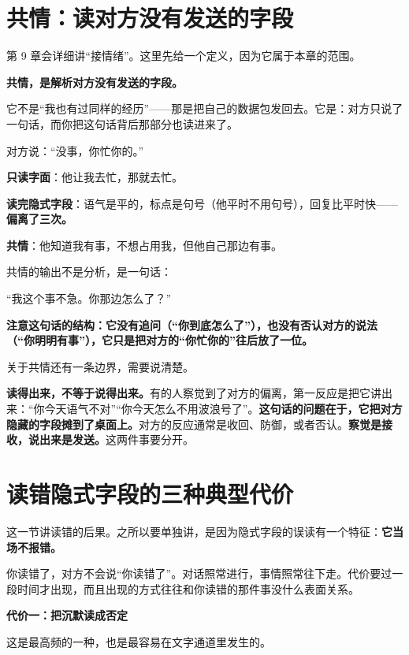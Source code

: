 \section{共情：读对方没有发送的字段}

第 9 章会详细讲“接情绪”。这里先给一个定义，因为它属于本章的范围。

\textbf{共情，是解析对方没有发送的字段。}

它不是“我也有过同样的经历”——那是把自己的数据包发回去。它是：对方只说了一句话，而你把这句话背后那部分也读进来了。

\begin{mdquote}
对方说：“没事，你忙你的。”

\textbf{只读字面}：他让我去忙，那就去忙。\par
\textbf{读完隐式字段}：语气是平的，标点是句号（他平时不用句号），回复比平时快——\textbf{偏离了三次。}\par
\textbf{共情}：他知道我有事，不想占用我，但他自己那边有事。
\end{mdquote}

共情的输出不是分析，是一句话：

\begin{mdquote}
“我这个事不急。你那边怎么了？”
\end{mdquote}

\textbf{注意这句话的结构：它没有追问（“你到底怎么了”），也没有否认对方的说法（“你明明有事”），它只是把对方的“你忙你的”往后放了一位。}

关于共情还有一条边界，需要说清楚。

\textbf{读得出来，不等于说得出来。}有的人察觉到了对方的偏离，第一反应是把它讲出来：“你今天语气不对”“你今天怎么不用波浪号了”。\textbf{这句话的问题在于，它把对方隐藏的字段摊到了桌面上。}对方的反应通常是收回、防御，或者否认。\textbf{察觉是接收，说出来是发送。}这两件事要分开。

\section{读错隐式字段的三种典型代价}

这一节讲读错的后果。之所以要单独讲，是因为隐式字段的误读有一个特征：\textbf{它当场不报错。}

你读错了，对方不会说“你读错了”。对话照常进行，事情照常往下走。代价要过一段时间才出现，而且出现的方式往往和你读错的那件事没什么表面关系。

\textbf{代价一：把沉默读成否定}

这是最高频的一种，也是最容易在文字通道里发生的。

